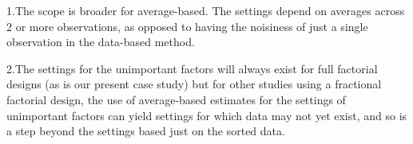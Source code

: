                   1.The scope is broader for
                    average-based.  The settings
                    depend on averages across 2 or
                    more observations, as opposed
                    to having the noisiness of
                    just a single observation in
                    the data-based method.

                  2.The settings for the
                    unimportant factors will
                    always exist for full
                    factorial designs (as is our
                    present case study) but for
                    other studies using a
                    fractional factorial design,
                    the use of average-based
                    estimates for the settings of
                    unimportant factors can yield
                    settings for which data may
                    not yet exist, and so is a
                    step beyond the settings based
                    just on the sorted data.

